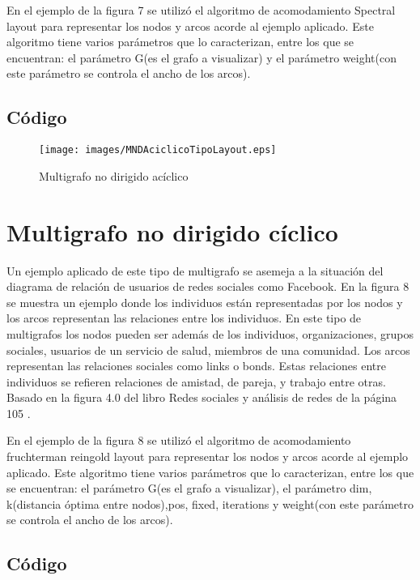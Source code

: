\documentclass{article}
\begin{document}
En el ejemplo de la figura 7 se utilizó el algoritmo de acomodamiento Spectral layout para representar los nodos y arcos acorde al ejemplo aplicado. Este algoritmo tiene varios parámetros que lo caracterizan, entre los que se encuentran: el parámetro G(es el grafo a visualizar) y el parámetro weight(con este parámetro se controla el ancho de los arcos).

\subsection{Código}



\begin{figure}[H]
\centering
\texttt{[image: images/MNDAciclicoTipoLayout.eps]}
\caption{Multigrafo no dirigido acíclico}
\end{figure}

\section{Multigrafo no dirigido cíclico}

Un ejemplo aplicado de este tipo de multigrafo se asemeja a la situación del diagrama de relación de usuarios de redes sociales como Facebook. En la figura 8 se muestra un ejemplo donde los individuos están representadas por los nodos y los arcos representan las relaciones entre los individuos. En este tipo de multigrafos los nodos pueden ser además de los individuos, organizaciones, grupos sociales, usuarios de un servicio de salud, miembros de una comunidad. Los arcos representan las relaciones sociales como links o bonds. Estas relaciones entre individuos se refieren relaciones de amistad, de pareja, y trabajo entre otras. Basado en la figura 4.0 del libro Redes sociales y análisis de redes de la página 105 \cite{josehernando}. 

En el ejemplo de la figura 8 se utilizó el algoritmo de acomodamiento  fruchterman reingold layout para representar los nodos y arcos acorde al ejemplo aplicado. Este algoritmo tiene varios parámetros que lo caracterizan, entre los que se encuentran: el parámetro G(es el grafo a visualizar), el parámetro dim, k(distancia óptima entre nodos),pos, fixed, iterations y weight(con este parámetro se controla el ancho de los arcos).

\subsection{Código}

\end{document}
